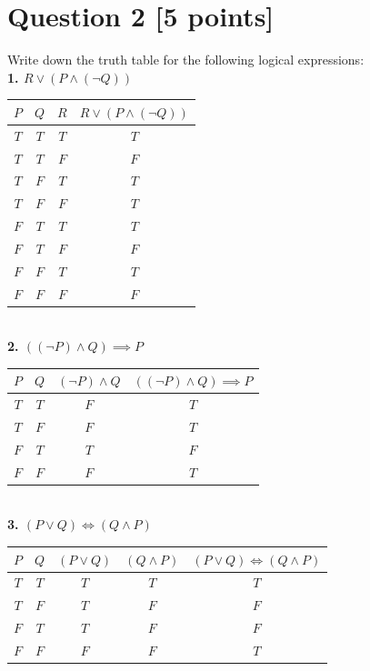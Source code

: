 \documentclass{report}
\theoremstyle{mytheoremstyle}
\theoremstyle{mytheoremstyle}
\theoremstyle{myproblemstyle}
\begin{document}
\section*{Question 2 [5 points]}
Write down the truth table for the following logical expressions:
\\[\baselineskip]
\noindent\textbf{1. $R \lor (P \land (\neg Q))$} 
\\[\baselineskip]
\begin{tabular}{|c|c|c|c|}
    \hline
    $P$ & $Q$ & $R$ & $R \lor (P \land (\neg Q))$ \\
    \hline
    \hline
    $T$ & $T$ & $T$ & $T$ \\
    \hline
    $T$ & $T$ & $F$ & $F$ \\
    \hline
    $T$ & $F$ & $T$ & $T$ \\
    \hline
    $T$ & $F$ & $F$ & $T$ \\
    \hline
    $F$ & $T$ & $T$ & $T$ \\
    \hline
    $F$ & $T$ & $F$ & $F$ \\
    \hline
    $F$ & $F$ & $T$ & $T$ \\
    \hline
    $F$ & $F$ & $F$ & $F$ \\
    \hline
\end{tabular}
\\[\baselineskip]
\noindent\textbf{2. $((\neg P) \land Q) \implies P$} 
\\[\baselineskip]
\begin{tabular}{|c|c|c|c|}
    \hline
    $P$ & $Q$ & $(\neg P) \land Q$ & $((\neg P) \land Q) \implies P$ \\
    \hline
    \hline
    $T$ & $T$ & $F$ & $T$ \\
    \hline
    $T$ & $F$ & $F$ & $T$ \\
    \hline
    $F$ & $T$ & $T$ & $F$ \\
    \hline
    $F$ & $F$ & $F$ & $T$ \\
    \hline
\end{tabular}
\\[\baselineskip]
\noindent\textbf{3. $(P \lor Q) \iff (Q \land P)$} 
\\[\baselineskip]
\begin{tabular}{|c|c|c|c|c|}
    \hline
    $P$ & $Q$ & $(P \lor Q)$ & $(Q \land P)$ & $(P \lor Q) \iff (Q \land P)$ \\
    \hline
    \hline
    $T$ & $T$ & $T$ & $T$ & $T$ \\
    \hline
    $T$ & $F$ & $T$ & $F$ & $F$ \\
    \hline
    $F$ & $T$ & $T$ & $F$ & $F$ \\
    \hline
    $F$ & $F$ & $F$ & $F$ & $T$ \\
    \hline
\end{tabular}
\newpage
\end{document}

